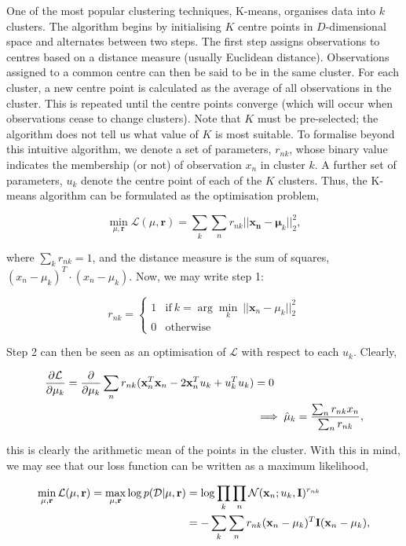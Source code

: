 \documentclass[11pt]{amsart}
\begin{document}
One of the most popular clustering techniques, K-means, organises data into $k$ clusters. The algorithm begins by initialising $K$ centre points in $D$-dimensional space and alternates between two steps. The first step assigns observations to centres based on a distance measure (usually Euclidean distance). Observations assigned to a common centre can then be said to be in the same cluster. For each cluster, a new centre point is calculated as the average of all observations in the cluster. This is repeated until the centre points converge (which will occur when observations cease to change clusters). Note that $K$ must be pre-selected; the algorithm does not tell us what value of $K$ is most suitable. To formalise beyond this intuitive algorithm, we denote a set of parameters, $r_{nk}$, whose binary value indicates the membership (or not) of observation $x_n$ in cluster $k$. A further set of parameters, $u_k$ denote the centre point of each of the $K$ clusters. Thus, the K-means algorithm can be formulated as the optimisation problem,

$$\min_{\mu, \mathbf{r}} \mathcal{L}(\mu, \mathbf{r}) = \sum_k\sum_n r_{nk}||\mathbf{x_n} - \mathbf{\mu}_k||^2_2,$$

where $\sum_k r_{nk} = 1$, and the distance measure is the sum of squares, $(x_n - \mu_k)^T\cdot(x_n - \mu_k)$. Now, we may write step 1:

\[r_{nk} = \begin{cases}
    1 & \text{if} \ k = \arg \min_k \ ||\mathbf{x}_n - \mu_k||_2^2 \\
    0 & \text{otherwise}
\end{cases}\]

Step 2 can then be seen as an optimisation of $\mathcal{L}$ with respect to each $u_k$. Clearly,

\begin{align}\frac{\partial\mathcal{L}}{\partial\mu_k} = \frac{\partial}{\partial\mu_k}\sum_n r_{nk} (\mathbf{x}_n^T\mathbf{x}_n - 2\mathbf{x}_n^Tu_k + u_k^Tu_k) &= 0 \notag \\
&\implies \hat{\mu}_k = \frac{\sum_nr_{nk}x_n}{\sum_nr_{nk}}, \notag
\end{align}

this is clearly the arithmetic mean of the points in the cluster. With this in mind, we may see that our loss function can be written as a maximum likelihood,

\begin{align}\min_{\mu, \mathbf{r}} \mathcal{L}(\mu, \mathbf{r}) = \max_{\mu, \mathbf{r}} \log p(\mathcal{D} | \mu, \mathbf{r}) &= \log\prod_k\prod_n \mathcal{N}(\mathbf{x}_n ; u_k, \mathbf{I})^{r_{nk}} \notag \\
&= -\sum_k\sum_nr_{nk}(\mathbf{x}_n - \mu_k)^T\mathbf{I}(\mathbf{x}_n - \mu_k), \notag
\end{align}
\end{document}
